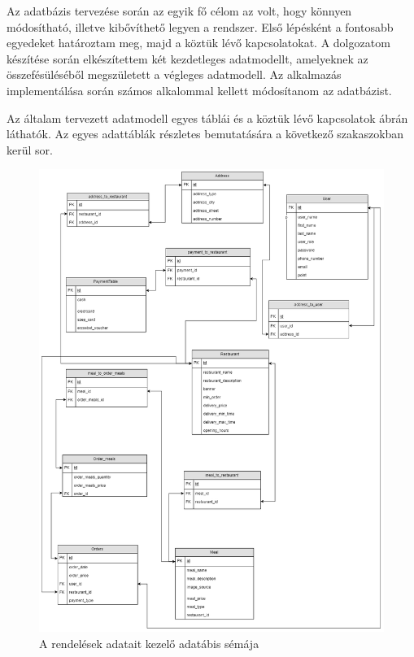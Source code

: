 
Az adatbázis tervezése során az egyik fő célom az volt, hogy könnyen módosítható, illetve kibővíthető legyen a rendszer. Első lépésként a fontosabb egyedeket határoztam meg, majd a köztük lévő kapcsolatokat. A dolgozatom készítése során elkészítettem két kezdetleges adatmodellt, amelyeknek az összefésüléséből megszületett a végleges adatmodell. Az alkalmazás implementálása során számos alkalommal kellett módosítanom az adatbázist.


Az általam tervezett adatmodell egyes táblái és a köztük lévő kapcsolatok  ábrán láthatók. Az egyes adattáblák részletes bemutatására a következő szakaszokban kerül sor.

\begin{figure}
\includegraphics[scale=0.4]{kepek/rendeles_sema.jpg}
\caption{A rendelések adatait kezelő adatábis sémája}
\label{fig:rendeles_sema}
\end{figure}

